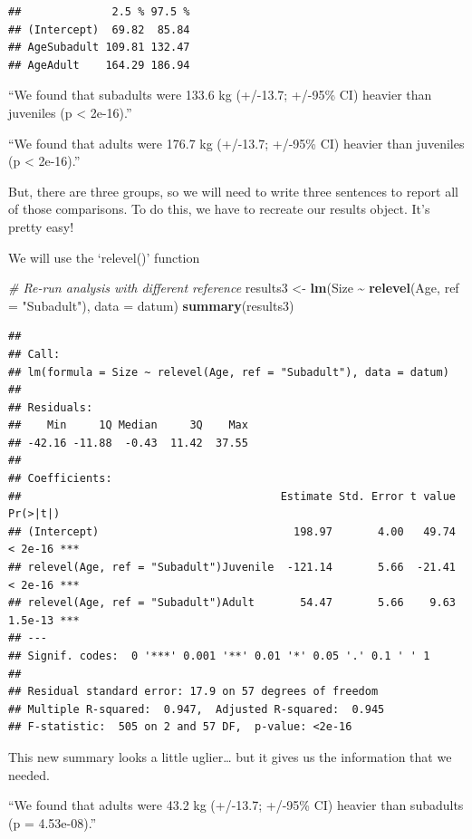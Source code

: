 \documentclass[
]{article}
\newenvironment{Shaded}{\begin{snugshade}}{\end{snugshade}}
\newcommand{\AttributeTok}[1]{\textcolor[rgb]{0.13,0.29,0.53}{#1}}
\newcommand{\CommentTok}[1]{\textcolor[rgb]{0.56,0.35,0.01}{\textit{#1}}}
\newcommand{\FunctionTok}[1]{\textcolor[rgb]{0.13,0.29,0.53}{\textbf{#1}}}
\newcommand{\NormalTok}[1]{#1}
\newcommand{\OtherTok}[1]{\textcolor[rgb]{0.56,0.35,0.01}{#1}}
\newcommand{\SpecialCharTok}[1]{\textcolor[rgb]{0.81,0.36,0.00}{\textbf{#1}}}
\newcommand{\StringTok}[1]{\textcolor[rgb]{0.31,0.60,0.02}{#1}}
\begin{document}
\begin{verbatim}
##              2.5 % 97.5 %
## (Intercept)  69.82  85.84
## AgeSubadult 109.81 132.47
## AgeAdult    164.29 186.94
\end{verbatim}

``We found that subadults were 133.6 kg (+/-13.7; +/-95\% CI) heavier
than juveniles (p \textless{} 2e-16).''

``We found that adults were 176.7 kg (+/-13.7; +/-95\% CI) heavier than
juveniles (p \textless{} 2e-16).''

But, there are three groups, so we will need to write three sentences to
report all of those comparisons. To do this, we have to recreate our
results object. It's pretty easy!

We will use the `relevel()' function

\begin{Shaded}
\begin{Highlighting}[]
\CommentTok{\# Re{-}run analysis with different reference}
\NormalTok{results3 }\OtherTok{\textless{}{-}} \FunctionTok{lm}\NormalTok{(Size }\SpecialCharTok{\textasciitilde{}} \FunctionTok{relevel}\NormalTok{(Age, }\AttributeTok{ref =} \StringTok{"Subadult"}\NormalTok{), }\AttributeTok{data =}\NormalTok{ datum)}
\FunctionTok{summary}\NormalTok{(results3)}
\end{Highlighting}
\end{Shaded}

\begin{verbatim}
## 
## Call:
## lm(formula = Size ~ relevel(Age, ref = "Subadult"), data = datum)
## 
## Residuals:
##    Min     1Q Median     3Q    Max 
## -42.16 -11.88  -0.43  11.42  37.55 
## 
## Coefficients:
##                                        Estimate Std. Error t value Pr(>|t|)    
## (Intercept)                              198.97       4.00   49.74  < 2e-16 ***
## relevel(Age, ref = "Subadult")Juvenile  -121.14       5.66  -21.41  < 2e-16 ***
## relevel(Age, ref = "Subadult")Adult       54.47       5.66    9.63  1.5e-13 ***
## ---
## Signif. codes:  0 '***' 0.001 '**' 0.01 '*' 0.05 '.' 0.1 ' ' 1
## 
## Residual standard error: 17.9 on 57 degrees of freedom
## Multiple R-squared:  0.947,  Adjusted R-squared:  0.945 
## F-statistic:  505 on 2 and 57 DF,  p-value: <2e-16
\end{verbatim}

This new summary looks a little uglier\ldots{} but it gives us the
information that we needed.

``We found that adults were 43.2 kg (+/-13.7; +/-95\% CI) heavier than
subadults (p = 4.53e-08).''
\end{document}
